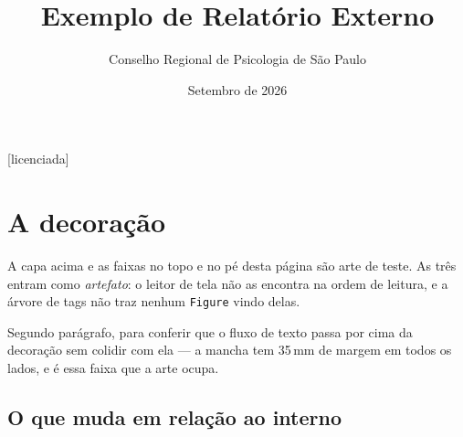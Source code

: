 \documentclass[externo]{crpsp-relatorio}
\title{Exemplo de Relatório Externo}
\author{Conselho Regional de Psicologia de São Paulo}
\date{Setembro de 2026}
\begin{document}
\relCapa

\begin{CreditoInstitucional}
\end{CreditoInstitucional}
\begin{NomesDuasColunas}
  [licenciada]
\end{NomesDuasColunas}
\begin{CreditoInstitucional}
\end{CreditoInstitucional}

\section{A decoração}

A capa acima e as faixas no topo e no pé desta página são arte de
teste. As três entram como \emph{artefato}: o leitor de tela não as
encontra na ordem de leitura, e a árvore de tags não traz nenhum
\texttt{Figure} vindo delas.

Segundo parágrafo, para conferir que o fluxo de texto passa por cima
da decoração sem colidir com ela — a mancha tem 35\,mm de margem em
todos os lados, e é essa faixa que a arte ocupa.

\subsection{O que muda em relação ao interno}
\end{document}
